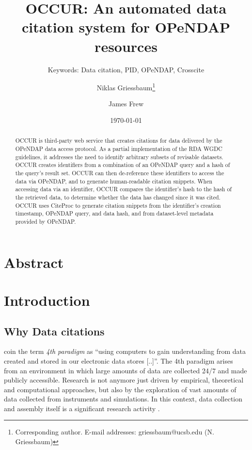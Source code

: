 \documentclass[letterpaper, twocolumn, parskip=half, fontsize=8pt, DIV=calc]{scrartcl}
\title{OCCUR: An automated data citation system for OPeNDAP resources}
\author{Niklas Griessbaum\thanks{Corresponding author. E-mail addresses: griessbaum@ucsb.edu (N. Griessbaum)} }
\author{James Frew}
\affil{Bren School of Environmental Science and Management, University of California, Santa Barbara, United States}
\subtitle{Keywords: Data citation, PID, OPeNDAP, Crosscite}
\date{\today}
\begin{document}
\maketitle
\tableofcontents

\newpage

\glsunsetall
\section*{Abstract}
\begin{abstract} 
\gls{OCCUR} is third-party web service that creates citations for data delivered by the \gls{OPeNDAP} data access protocol.
As a partial implementation of the \gls{RDA} \gls{WGDC} guidelines, it addresses the need to identify arbitrary subsets of revisable datasets.
OCCUR creates identifiers from a combination of an OPeNDAP query and a hash of the query's result set.
OCCUR can then de-reference these identifiers to access the data via OPeNDAP, and to generate human-readable citation snippets.
When accessing data via an identifier, OCCUR compares the identifier's hash to the hash of the retrieved data, to determine whether the data has changed since it was cited.
OCCUR uses CiteProc to generate citation snippets from the identifier's creation timestamp, OPeNDAP query, and data hash, and from dataset-level metadata provided by OPeNDAP.
\end{abstract}
\glsresetall



\section{Introduction}

\subsection{Why Data citations}

\cite{Hey2009} coin the term \textit{4th paradigm} as ``using computers to gain understanding from data created and stored in our electronic data stores [..]''.
The 4th paradigm arises from an environment in which large amounts of data are collected 24/7 and made publicly accessible. Research is not anymore just driven by empirical, theoretical and computational approaches, but also by the exploration of vast amounts of data collected from instruments and simulations. In this context, data collection and assembly itself is a significant research activity \citep{Frew2012}.
\end{document}
